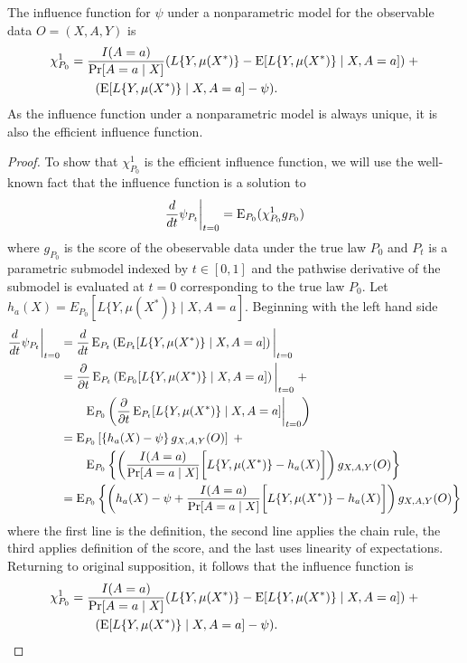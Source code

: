 \begin{theorem}
    The influence function for $\psi$ under a nonparametric model for the observable data $O = (X, A, Y)$ is 
\begin{align*}
    \chi_{P_0}^1 &= \frac{I(A = a)}{\Pr[A = a \mid X]}(L\{Y, \mu(X^*)\} - \operatorname{E}[L\{Y, \mu(X^*)\} \mid X, A=a])  \; + \\
    & \qquad (\operatorname{E}[L\{Y, \mu(X^*)\} \mid X, A=a] - \psi).
\end{align*}
As the influence function under a nonparametric model is always unique, it is also the efficient influence function. 
\end{theorem}


\begin{proof}
To show that $\chi_{P_0}^1$ is the efficient influence function, we will use the well-known fact that the influence function is a solution to 
\begin{equation*}
    \frac{d}{dt} \psi_{P_t}\bigg\vert_{t=0} = \operatorname{E}_{P_0}(\chi_{P_0}^1g_{P_0})
\end{equation*}
where $g_{P_0}$ is the score of the obeservable data under the true law $P_0$ and $P_t$ is a parametric submodel indexed by $t \in [0,1]$ and the pathwise derivative of the submodel is evaluated at $t = 0$ corresponding to the true law $P_0$. Let $h_a(X) = E_{P_0}[L\{Y, \mu(X^*)\} \mid X, A=a]$. Beginning with the left hand side
\begin{align*}
    \frac{d}{dt} \psi_{P_t}\bigg\vert_{t=0} &=\frac{d}{dt} \operatorname{E}_{P_t}\left(\operatorname{E}_{P_t}[L\{Y, \mu(X^*)\} \mid X, A=a] \right)\bigg\vert_{t=0} \\
    &=\frac{\partial}{\partial t} \operatorname{E}_{P_t}\left(\operatorname{E}_{P_0}[L\{Y, \mu(X^*)\} \mid X, A=a] \right)\bigg\vert_{t=0} \;+ \\
    &\qquad  \operatorname{E}_{P_0}\left(\frac{\partial}{\partial t} \operatorname{E}_{P_t}[L\{Y, \mu(X^*)\} \mid X, A=a] \bigg\vert_{t=0} \right) \\
    &=\operatorname{E}_{P_0}\left[\left\{h_a(X) - \psi \right\}g_{X, A, Y}(O)\right] \;+ \\
    &\qquad  \operatorname{E}_{P_0}\left\{\left( \frac{I(A = a)}{\Pr[A = a \mid X]} \bigg[L\{Y, \mu(X^*)\} - h_a(X) \bigg]\right)g_{X, A, Y}(O)\right\} \\
    &= \operatorname{E}_{P_0}\left\{\left(h_a(X) - \psi + \frac{I(A = a)}{\Pr[A = a \mid X]} \bigg[L\{Y, \mu(X^*)\} - h_a(X) \bigg]\right)g_{X, A, Y}(O)\right\} 
\end{align*}
where the first line is the definition, the second line applies the chain rule, the third applies definition of the score, and the last uses linearity of expectations. Returning to original supposition, it follows that the influence function is 
\begin{align*}
    \chi_{P_0}^1 &= \frac{I(A = a)}{\Pr[A = a \mid X]}(L\{Y, \mu(X^*)\} - \operatorname{E}[L\{Y, \mu(X^*)\} \mid X, A=a])  \; + \\
    & \qquad (\operatorname{E}[L\{Y, \mu(X^*)\} \mid X, A=a] - \psi).
\end{align*}
\end{proof}

